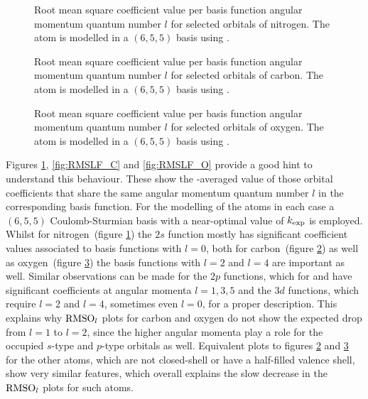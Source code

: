 \begin{figure}
	\centering
	\caption[
		Root mean square coefficient value
		per angular momentum for nitrogen
	]
	{
		Root mean square coefficient value per
		basis function angular momentum quantum number $l$
		for selected orbitals of nitrogen.
		The atom is modelled
		in a $(6,5,5)$ \CS basis using \UHF.
	}
	\label{fig:RMSLF_N}
\end{figure}
\begin{figure}
	\centering
	\caption[
		Root mean square coefficient value
		per angular momentum for carbon
	]
	{
		Root mean square coefficient value per
		basis function angular momentum quantum number $l$
		for selected orbitals of carbon.
		The atom is modelled
		in a $(6,5,5)$ \CS basis using \UHF.
	}
	\label{fig:RMSLF_C}
\end{figure}
\begin{figure}
	\centering
	\caption[
		Root mean square coefficient value
		per angular momentum for oxygen
	]
	{
		Root mean square coefficient value per
		basis function angular momentum quantum number $l$
		for selected orbitals of oxygen.
		The atom is modelled
		in a $(6,5,5)$ \CS basis using \UHF.
	}
	\label{fig:RMSLF_O}
\end{figure}
Figures
\ref{fig:RMSLF_N}, \vref{fig:RMSLF_C} and \vref{fig:RMSLF_O}
provide a good hint to understand this behaviour.
These show the \RMS-averaged value of those orbital coefficients
that share the same angular momentum quantum number $l$ in the corresponding
basis function.
For the modelling of the atoms in each case
a $(6,5,5)$ Coulomb-Sturmian basis with a near-optimal value of $k_\text{exp}$ is employed.
Whilst for nitrogen~(figure \ref{fig:RMSLF_N})
the $2s$ function mostly has significant coefficient values
associated to basis functions with $l=0$,
both for carbon~(figure \ref{fig:RMSLF_C}) as well as oxygen~(figure \ref{fig:RMSLF_O})
the basis functions with $l=2$ and $l=4$ are important as well.
Similar observations can be made for the $2p$ functions,
which for  and  have significant coefficients at angular momenta
$l=1,3,5$ and the $3d$ functions, which require $l=2$ and $l=4$,
sometimes even $l=0$, for a proper description.
This explains why $\text{RMSO}_l$ plots for carbon
and oxygen do not show the expected drop from $l=1$ to $l=2$,
since the higher angular momenta play a role
for the occupied $s$-type and $p$-type \SCF orbitals as well.
Equivalent plots to figures \ref{fig:RMSLF_C} and \ref{fig:RMSLF_O}
for the other atoms,
which are not closed-shell
or have a half-filled valence shell,
show very similar features,
which overall explains the slow decrease
in the $\text{RMSO}_l$ plots for such atoms.

